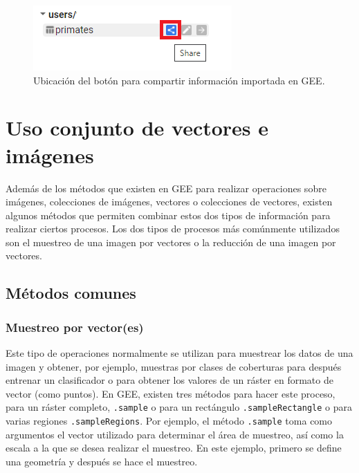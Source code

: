 \documentclass[
  12pt,
  letterpaper,
  twoside]{book}
\begin{document}
\begin{figure}[btp]

{\centering \includegraphics[width=0.3\linewidth]{Img/shareAssets} 

}

\caption{Ubicación del botón para compartir información importada en GEE.}\label{fig:unnamed-chunk-175}
\end{figure}

\newpage

\hypertarget{uso-conjunto-de-vectores-e-imuxe1genes}{%
\chapter{Uso conjunto de vectores e imágenes}\label{uso-conjunto-de-vectores-e-imuxe1genes}}

Además de los métodos que existen en GEE para realizar operaciones sobre imágenes, colecciones de imágenes, vectores o colecciones de vectores, existen algunos métodos que permiten combinar estos dos tipos de información para realizar ciertos procesos. Los dos tipos de procesos más comúnmente utilizados son el muestreo de una imagen por vectores o la reducción de una imagen por vectores.

\hypertarget{muxe9todos-comunes-5}{%
\section{Métodos comunes}\label{muxe9todos-comunes-5}}

\hypertarget{muestreo-por-vectores}{%
\subsection{Muestreo por vector(es)}\label{muestreo-por-vectores}}

Este tipo de operaciones normalmente se utilizan para muestrear los datos de una imagen y obtener, por ejemplo, muestras por clases de coberturas para después entrenar un clasificador o para obtener los valores de un ráster en formato de vector (como puntos). En GEE, existen tres métodos para hacer este proceso, para un ráster completo, \texttt{.sample} o para un rectángulo \texttt{.sampleRectangle} o para varias regiones \texttt{.sampleRegions}. Por ejemplo, el método \texttt{.sample} toma como argumentos el vector utilizado para determinar el área de muestreo, así como la escala a la que se desea realizar el muestreo. En este ejemplo, primero se define una geometría y después se hace el muestreo.
\end{document}
